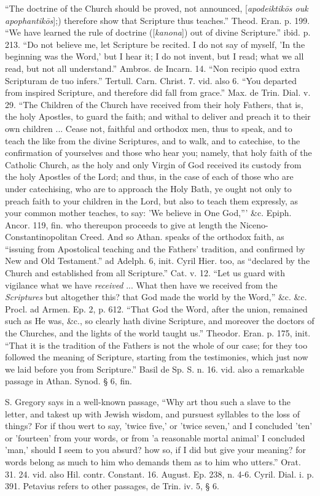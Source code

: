 ``The
doctrine of the Church should be proved, not announced, [\emph{apodeiktik\={o}s
ouk apophantik\={o}s}];) therefore show that Scripture thus
teaches.'' Theod. Eran. p. 199. ``We have learned the rule of doctrine
([\emph{kanona}]) out of divine Scripture.'' ibid. p. 213. ``Do not
believe me, let Scripture be recited. I do not say of myself, 'In the
beginning was the Word,' but I hear it; I do not invent, but I read;
what we all read, but not all understand.'' Ambros. de Incarn. 14. ``Non
recipio quod extra Scripturam de tuo infers.'' Tertull. Carn. Christ.
7. vid. also 6. ``You departed from inspired Scripture, and therefore
did fall from grace.'' Max. de Trin. Dial. v. 29. ``The Children of the
Church have received from their holy Fathers, that is, the holy
Apostles, to guard the faith; and withal to deliver and preach it to
their own children ... Cease not, faithful and orthodox men, thus to
speak, and to teach the like from the divine Scriptures, and to walk,
and to catechise, to the confirmation of yourselves and those who hear
you; namely, that holy faith of the Catholic Church, as the holy and
only Virgin of God received its custody from the holy Apostles of the
Lord; and thus, in the case of each of those who are under catechising,
who are to approach the Holy Bath, ye ought not only to preach faith
to your children in the Lord, but also to teach them expressly, as
your common mother teaches, to say: 'We believe in One God,''' \&c.
Epiph. Ancor. 119, fin. who thereupon proceeds to give at length the
Niceno-Constantinopolitan Creed. And so Athan. speaks of the orthodox
faith, as ``issuing from Apostolical teaching and the Fathers'
tradition, and confirmed by New and Old Testament.'' ad Adelph. 6,
init. Cyril Hier. too, as ``declared by the Church and established from
all Scripture.'' Cat. v. 12. ``Let us guard with vigilance what we have \emph{received}
... What then have we received from the \emph{Scriptures} but
altogether this? that God made the world by the Word,'' \&c. \&c.
Procl. ad Armen. Ep. 2, p. 612. ``That God the Word, after the union,
remained such as He was, \&c., so clearly hath divine Scripture,
and moreover the doctors of the Churches, and the lights of the world
taught us.'' Theodor. Eran. p. 175, init. ``That it is the tradition of
the Fathers is not the whole of our case; for they too followed the
meaning of Scripture, starting from the testimonies, which just now we
laid before you from Scripture.'' Basil de Sp. S. n. 16. vid. also a
remarkable passage in Athan. Synod. § 6, fin.

S.
Gregory says in a well-known passage, ``Why art thou such a slave to
the letter, and takest up with Jewish wisdom, and pursuest syllables
to the loss of things? For if thou wert to say, 'twice five,' or
'twice seven,' and I concluded 'ten' or 'fourteen' from your words, or
from 'a reasonable mortal animal' I concluded 'man,' should I seem to
you absurd? how so, if I did but give your meaning? for
words belong as much to him who demands them as to him who utters.''
Orat. 31. 24. vid. also Hil. contr. Constant. 16. August. Ep. 238, n.
4-6. Cyril. Dial. i. p. 391. Petavius refers to other passages, de
Trin. iv. 5, § 6.


